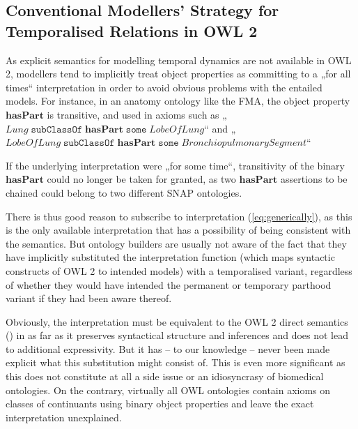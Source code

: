 \documentclass{ao2e}
\newcommand{\mirel}[1]{\ensuremath{\mathrm{\mathbf{#1}}}}
\newcommand{\mclass}[1]{\ensuremath{\mathit{#1}}}
\begin{document}
\subsection{Conventional Modellers’ Strategy for Temporalised Relations in OWL 2}

As explicit semantics for modelling temporal dynamics are not available in OWL
2, modellers tend to implicitly treat object properties as committing to a 
„for all times“ interpretation in order to avoid obvious problems with the
entailed models. For instance, in an anatomy ontology like the FMA, the object
property \mirel{hasPart} is transitive, and used in axioms such as
„$\mclass{Lung}\;\mathtt{subClassOf}\;\mirel{hasPart}\;\mathtt{some}\;\mclass{LobeOfLung}$“
and „$\mclass{LobeOfLung}\;\mathtt{subClassOf}\;\mirel{hasPart}\;\mathtt{some}\;\mclass{BronchiopulmonarySegment}$“

If the underlying interpretation were „for some time“, transitivity of the
binary \mirel{hasPart} could no longer be taken for granted, as two
\mirel{hasPart} assertions to be chained could belong to two different SNAP
ontologies.

There is thus good reason to subscribe to interpretation (\ref{eq:generically}),
as this is the only available interpretation that has a possibility of being
consistent with the semantics. But ontology builders are usually not aware of
the fact that they have implicitly substituted the interpretation function
(which maps syntactic constructs of OWL 2 to intended models) with a
temporalised variant, regardless of whether they would have intended the
permanent or temporary parthood variant if they had been aware thereof.

Obviously, the interpretation must be equivalent to the OWL 2 direct semantics
(\cite{OWL2:direct}) in as far as it preserves syntactical structure and inferences and does not
lead to additional expressivity. But it has – to our knowledge – never been made
explicit what this substitution might consist of.  This is even more significant
as this does not constitute at all a side issue or an idiosyncrasy of biomedical
ontologies. On the contrary, virtually all OWL ontologies contain axioms on
classes of continuants using binary object properties and leave the exact
interpretation unexplained. 
\end{document}
